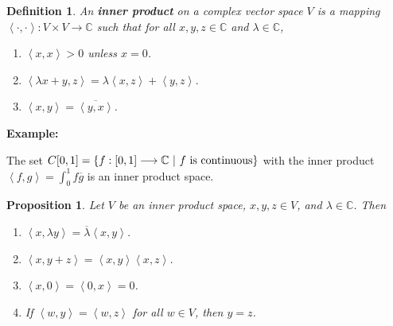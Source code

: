 \documentclass{article}
\theoremstyle{colontheorem}
\newtheorem{proposition}[theorem]{Proposition}
\newtheorem{definition}[theorem]{Definition}
\newenvironment{Proposition}
{
	\begin{mdframed}[backgroundcolor=TheoremOrange!10]
	\begin{proposition}
}
{
	\end{proposition}
	\end{mdframed}
	
	\vspace{.15in}
}
\newenvironment{Def}
{
	\begin{mdframed}[backgroundcolor=DefGreen!10]
	\begin{definition}
}
{
	\end{definition}
	\end{mdframed}
	
	\vspace{.15in}
}
\newenvironment{Example}
{
	\begin{mdframed}
	\textbf{Example:}%
}
{
	\end{mdframed}
	
	\vspace{.15in}
}
\begin{document}
\begin{Def}
	
	An \textbf{inner product} on a complex vector space $V$ is a mapping $\left< \cdot, \cdot \right> : V \times V \longrightarrow \mathbb{C}$ such that for all $x, y, z \in \mathbb{C}$ and $\lambda \in \mathbb{C}$,
	
	\begin{enumerate}
		
		\item $\left< x, x \right> > 0$ unless $x = 0$.
		
		\item $\left< \lambda x + y, z \right> = \lambda \left< x, z \right> + \left< y, z \right>$.
		
		\item $\left< x, y \right> = \overline{\left< y, x \right>}$.
		
	\end{enumerate}
	
\end{Def}



\begin{Example}
	The set $C[0, 1] = \{f : [0, 1] \longrightarrow \mathbb{C}\ |\ f\textnormal{ is continuous} \}$ with the inner product $\left< f, g \right> = \int_0^1 f\overline{g}$ is an inner product space.
	
\end{Example}



\begin{Proposition}
	
	Let $V$ be an inner product space, $x, y, z \in V$, and $\lambda \in \mathbb{C}$. Then
	
	\begin{enumerate}
		
		\item $\left< x, \lambda y \right> = \overline{\lambda} \left< x, y \right>$.
		
		\item $\left< x, y + z \right> = \left< x, y \right> \left< x, z \right>$.
		
		\item $\left< x, 0 \right> = \left< 0, x \right> = 0$.
		
		\item If $\left< w, y \right> = \left< w, z \right>$ for all $w \in V$, then $y = z$.
		
	\end{enumerate}
	
\end{Proposition}
\end{document}
